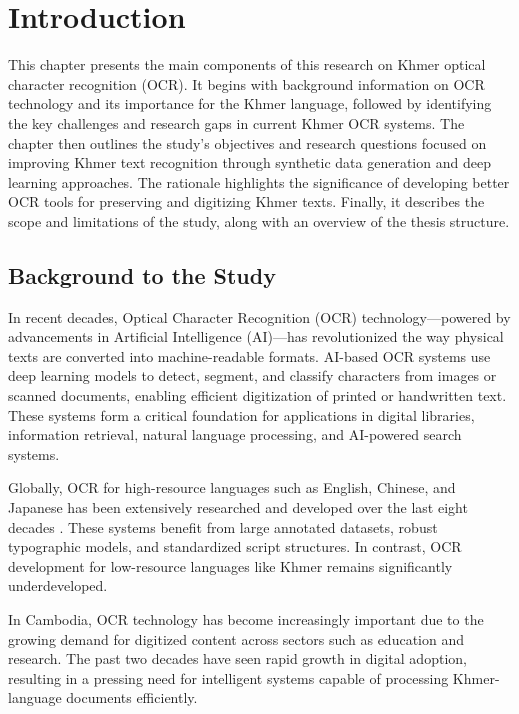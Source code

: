 \clearpage
{}
\setcounter{page}{1}

\label{ch:intro}
\chapter{Introduction}

This chapter presents the main components of this research on Khmer optical character recognition (OCR). It begins with background information on OCR technology and its importance for the Khmer language, followed by identifying the key challenges and research gaps in current Khmer OCR systems. The chapter then outlines the study's objectives and research questions focused on improving Khmer text recognition through synthetic data generation and deep learning approaches. The rationale highlights the significance of developing better OCR tools for preserving and digitizing Khmer texts. Finally, it describes the scope and limitations of the study, along with an overview of the thesis structure.

\section{Background to the Study}
\label{sec:background}

In recent decades, Optical Character Recognition (OCR) technology—powered by advancements in Artificial Intelligence (AI)—has revolutionized the way physical texts are converted into machine-readable formats. AI-based OCR systems use deep learning models to detect, segment, and classify characters from images or scanned documents, enabling efficient digitization of printed or handwritten text. These systems form a critical foundation for applications in digital libraries, information retrieval, natural language processing, and AI-powered search systems.

Globally, OCR for high-resource languages such as English, Chinese, and Japanese has been extensively researched and developed over the last eight decades \citep{memon2020handwritten}. These systems benefit from large annotated datasets, robust typographic models, and standardized script structures. In contrast, OCR development for low-resource languages like Khmer remains significantly underdeveloped.

In Cambodia, OCR technology has become increasingly important due to the growing demand for digitized content across sectors such as education and research. The past two decades have seen rapid growth in digital adoption, resulting in a pressing need for intelligent systems capable of processing Khmer-language documents efficiently.

